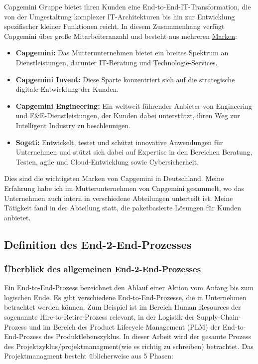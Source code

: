 \documentclass[a4paper, 12pt]{scrartcl}
\begin{document}
Capgemini Gruppe bietet ihren Kunden eine End-to-End-IT-Transformation, die von der Umgestaltung komplexer IT-Architekturen bis hin zur Entwicklung spezifischer kleiner Funktionen reicht. In diesem Zusammenhang verfügt Capgemini über große Mitarbeiteranzahl und besteht aus mehreren \href{https://www.capgemini.com/de-de/unternehmen/wer-wir-sind/unsere-marken/}{ Marken}:
	\begin{itemize}
		\item \textbf{Capgemini:} Das Mutterunternehmen bietet ein breites Spektrum an Dienstleistungen, darunter IT-Beratung und Technologie-Services.
		
		\item \textbf{Capgemini Invent:} Diese Sparte konzentriert sich auf die strategische digitale Entwicklung der Kunden.
		\item \textbf{Capgemini Engineering:} Ein weltweit führender Anbieter von Engineering- und F\&E-Dienstleistungen, der Kunden dabei unterstützt, ihren Weg zur Intelligent Industry zu beschleunigen.
		\item \textbf{Sogeti:} Entwickelt, testet und schützt innovative Anwendungen für Unternehmen und stützt sich dabei auf Expertise in den Bereichen Beratung, Testen, agile und Cloud-Entwicklung sowie Cybersicherheit.
	\end{itemize}
Dies sind die wichtigsten Marken von Capgemini in Deutschland. Meine Erfahrung habe ich im Mutterunternehmen von Capgemini gesammelt, wo das Unternehmen auch intern in verschiedene Abteilungen unterteilt ist. Meine Tätigkeit fand in der Abteilung statt, die paketbasierte Lösungen %
  für Kunden anbietet.


	\newpage
	\subsection{Definition des End-2-End-Prozesses}
	\subsubsection{Überblick des allgemeinen End-2-End-Prozesses} %
Ein End-to-End-Prozess bezeichnet den Ablauf einer Aktion vom Anfang bis zum logischen Ende. Es gibt verschiedene End-to-End-Prozesse, die in Unternehmen betrachtet werden können. Zum Beispiel ist im Bereich Human Resources der sogenannte Hire-to-Retire-Prozess relevant, in der Logistik der Supply-Chain-Prozess und im Bereich des Product Lifecycle Management (PLM) der End-to-End-Prozess des Produktlebenszyklus.
\newline
In dieser Arbeit wird der gesamte Prozess des Projektzyklus/projektmanagment(wie es richtig zu schreiben) betrachtet. Das Projektmanagment besteht üblicherweise aus 5 Phasen\cite{timinger2024modernes}:%
\end{document}
